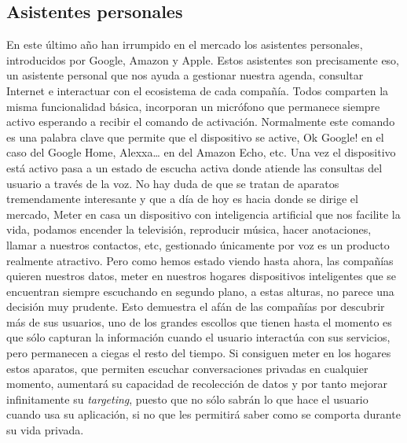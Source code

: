 \documentclass[12pt,a4paper,oneside]{book} %
\begin{document}
\subsection{Asistentes personales}
En este último año han irrumpido en el mercado los asistentes personales, introducidos por Google, Amazon y Apple. Estos asistentes son precisamente eso, un asistente personal que nos ayuda a gestionar nuestra agenda, consultar Internet e interactuar con el ecosistema de cada compañía. 
\newline
\newline
Todos comparten la misma funcionalidad básica, incorporan un micrófono que permanece siempre activo esperando a recibir el comando de activación. Normalmente este comando es una palabra clave que permite que el dispositivo se active, Ok Google! en el caso del Google Home, Alexxa… en del Amazon Echo, etc. Una vez el dispositivo está activo pasa a un estado de escucha activa donde atiende las consultas del usuario a través de la voz. 
\newline
\newline
No hay duda de que se tratan de aparatos tremendamente interesante y que a día de hoy es hacia donde se dirige el mercado, Meter en casa un dispositivo con inteligencia artificial que nos facilite la vida, podamos encender la televisión, reproducir música, hacer anotaciones, llamar a nuestros contactos, etc, gestionado únicamente por voz es un producto realmente atractivo.  
\newline
\newline
Pero como hemos estado viendo hasta ahora, las compañías quieren nuestros datos, meter en nuestros hogares dispositivos inteligentes que se encuentran siempre escuchando en segundo plano, a estas alturas, no parece una decisión muy prudente. 
\newline
\newline
Esto demuestra el afán de las compañías por descubrir más de sus usuarios, uno de los grandes escollos que tienen hasta el momento es que sólo capturan la información cuando el usuario interactúa con sus servicios, pero permanecen a ciegas el resto del tiempo. Si consiguen meter en los hogares estos aparatos, que permiten escuchar conversaciones privadas en cualquier momento, aumentará su capacidad de recolección de datos y por tanto mejorar infinitamente su \textit{targeting}, puesto que no sólo sabrán lo que hace el usuario cuando usa su aplicación, si no que les permitirá saber como se comporta durante su vida privada. 
\newline
\end{document}
